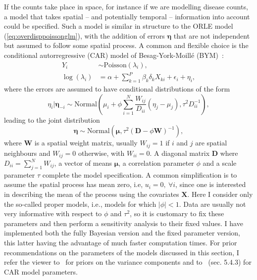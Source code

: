 If the counts take place in space, for instance if we are modelling disease counts, a model that takes spatial -- and potentially temporal -- information into account could be specified.
Such a model is similar in structure to the ORLE model (\ref{eq:overdisppoissonglm}), with the addition of errors $\boldsymbol\eta$  that are not independent but assumed to follow some spatial process.
A common and flexible choice is the conditional autorregressive (CAR) model of Besag-York-Moill\'e (BYM)~\citep{Besag1991}:
\begin{align}
 \label{eq:bym}
   Y_i &\sim \text{Poisson}(\lambda_i), \\
  \log(\lambda_i) &= \alpha + \sum_{k=1}^P \beta_k\delta_k X_{ki} + \epsilon_i + \eta_i,
\end{align}
where the errors are assumed to have conditional distributions of the form
\begin{equation}
 \eta_i | \boldsymbol\eta_{-i} \sim \text{Normal}\left(\mu_i + \phi\sum_{i=1}^N\frac{W_{ij}}{D_{ii}}\left( \eta_j-\mu_j \right), \tau^2 D_{ii}^{-1} \right), 
\end{equation}
leading to the joint distribution
\begin{equation}
 \boldsymbol\eta \sim \text{Normal}\left(\boldsymbol\mu,  \tau^2 \left( \boldsymbol D - \phi \boldsymbol W \right)^{-1} \right),
\end{equation}
where $\boldsymbol W$ is a spatial weight matrix, usually $W_{ij} = 1$ if $i$ and $j$ are spatial neighbours and $W_{ij} = 0$ otherwise, with $W_{ii} = 0$.
A diagonal matrix $\boldsymbol D$ where $D_{ii} = \sum_{j = 1}^N W_{ij}$, a vector of means $\boldsymbol\mu$, a correlation parameter $\phi$ and a scale parameter $\tau$ complete the model specification.
A common simplification is to assume the spatial process has mean zero, i.e, $u_i = 0,\:\forall i$, since one is interested in describing the mean of the process using the covariates $\boldsymbol X$.
Here I consider only the so-called proper models, i.e., models for which  $|\phi| < 1$.
Data are usually not very informative with respect to $\phi$ and $\tau^2$, so it is customary to fix these parameters and then perform a sensitivity analysis to their fixed values.
I have implemented both the fully Bayesian version and the fixed parameter version, this latter having the advantage of much faster computation times.
For prior recommendations on the parameters of the models discussed in this section, I refer the viewer to~\cite{Gelman2006} for priors on the variance components and to~\cite{Banerjee2003} (sec. 5.4.3) for CAR model parameters.


